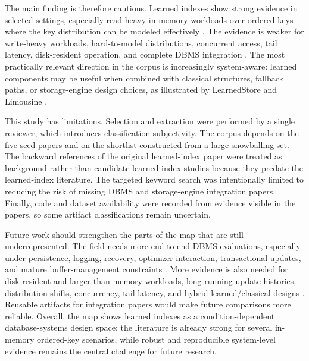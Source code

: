 \documentclass[a4paper, 12pt, twoside]{report}
\begin{document}
The main finding is therefore cautious. Learned indexes show strong evidence in selected settings, especially read-heavy in-memory workloads over ordered keys where the key distribution can be modeled effectively \cite{kraska2018,marcus2020benchmarking,sun2023learned}. The evidence is weaker for write-heavy workloads, hard-to-model distributions, concurrent access, tail latency, disk-resident operation, and complete DBMS integration \cite{wongkham2022ready,lan2023disk,luo2025robustness,fuad2026postlearn}. The most practically relevant direction in the corpus is increasingly system-aware: learned components may be useful when combined with classical structures, fallback paths, or storage-engine design choices, as illustrated by LearnedStore and Limousine \cite{maharjan2023learnedstore,chatterjee2024limousine}.

This study has limitations. Selection and extraction were performed by a single reviewer, which introduces classification subjectivity. The corpus depends on the five seed papers and on the shortlist constructed from a large snowballing set. The backward references of the original learned-index paper were treated as background rather than candidate learned-index studies because they predate the learned-index literature. The targeted keyword search was intentionally limited to reducing the risk of missing DBMS and storage-engine integration papers. Finally, code and dataset availability were recorded from evidence visible in the papers, so some artifact classifications remain uncertain.

Future work should strengthen the parts of the map that are still underrepresented. The field needs more end-to-end DBMS evaluations, especially under persistence, logging, recovery, optimizer interaction, transactional updates, and mature buffer-management constraints \cite{lan2023disk,fuad2026postlearn}. More evidence is also needed for disk-resident and larger-than-memory workloads, long-running update histories, distribution shifts, concurrency, tail latency, and hybrid learned/classical designs \cite{wongkham2022ready,chatterjee2024limousine,liang2024swix,luo2025robustness}. Reusable artifacts for integration papers would make future comparisons more reliable. Overall, the map shows learned indexes as a condition-dependent database-systems design space: the literature is already strong for several in-memory ordered-key scenarios, while robust and reproducible system-level evidence remains the central challenge for future research.
\end{document}
